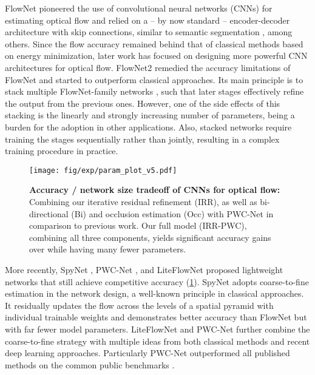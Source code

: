 \documentclass[10pt,twocolumn,letterpaper]{article}
\begin{document}
FlowNet \cite{Dosovitskiy:2015:FLO} pioneered the use of convolutional neural networks (CNNs) for estimating optical flow and relied on a -- by now standard -- encoder-decoder architecture with skip connections, similar to semantic segmentation \cite{Long:2015:FCN}, among others.
Since the flow accuracy remained behind that of classical methods based on energy minimization, later work has focused on designing more powerful CNN architectures for optical flow.
FlowNet2 \cite{Ilg:2017:FN2} remedied the accuracy limitations of FlowNet and started to outperform classical approaches.
Its main principle is to stack multiple FlowNet-family networks \cite{Dosovitskiy:2015:FLO}, such that later stages effectively refine the output from the previous ones.
However, one of the side effects of this stacking is the linearly and strongly increasing number of parameters, being a burden for the adoption in other applications.
Also, stacked networks require training the stages sequentially rather than jointly, resulting in a complex training procedure in practice.

\begin{figure}[t]
\centering 
\texttt{[image: fig/exp/param\_plot\_v5.pdf]}
\caption{\textbf{Accuracy / network size tradeoff of CNNs for optical flow:}
Combining our iterative residual refinement (IRR), as well as bi-directional (Bi) and occlusion estimation (Occ) with PWC-Net \cite{Sun:2017:PWC} in comparison to previous work.
Our full model (IRR-PWC), combining all three components, yields significant accuracy gains over \cite{Sun:2017:PWC} while having many fewer parameters.}
\label{fig:param_plot}
\vspace{-0.5em}
\end{figure}

More recently, SpyNet \cite{Ranjan:2017:OFE}, PWC-Net \cite{Sun:2017:PWC}, and LiteFlowNet \cite{Hui:2018:LFN} proposed lightweight networks that still achieve competitive accuracy (\cf\cref{fig:param_plot}).
SpyNet adopts coarse-to-fine estimation in the network design, a well-known principle in classical approaches.
It residually updates the flow across the levels of a spatial pyramid with individual trainable weights and demonstrates better accuracy than FlowNet but with far fewer model parameters.
LiteFlowNet and PWC-Net further combine the coarse-to-fine strategy with multiple ideas from both classical methods and recent deep learning approaches. 
Particularly PWC-Net outperformed all published methods on the common public benchmarks \cite{Butler:2012:NOS,Geiger:2012:AWR,Menze:2015:OSF}.
\end{document}
